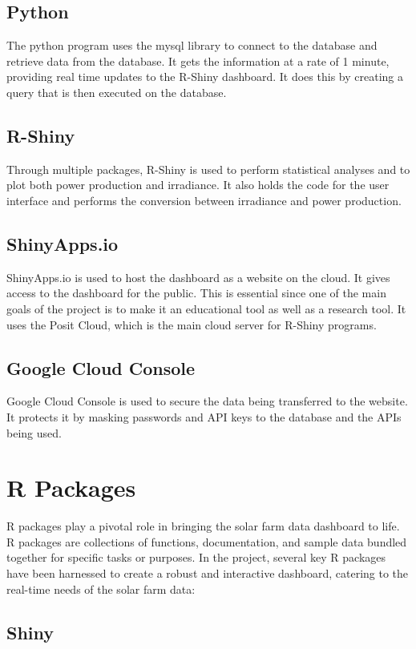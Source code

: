 \documentclass{sigchi}
\begin{document}
\subsection{Python}
The python program uses the mysql library\cite{MySQL} to connect to the database and retrieve data from the database. It gets the information at a rate of 1 minute, providing real time updates to the R-Shiny dashboard. It does this by creating a query that is then executed on the database.

\subsection{R-Shiny}
Through multiple packages, R-Shiny is used to perform statistical analyses and to plot both power production and irradiance. It also holds the code for the user interface and performs the conversion between irradiance and power production. 

\subsection{ShinyApps.io} 
ShinyApps.io is used to host the dashboard as a website on the cloud. It gives access to the dashboard for the public. This is essential since one of the main goals of the project is to make it an educational tool as well as a research tool. It uses the Posit Cloud, which is the main cloud server for R-Shiny programs.

\subsection{Google Cloud Console}
Google Cloud Console is used to secure the data being transferred to the website. It protects it by masking passwords and API keys to the database and the APIs being used.

\section{R Packages}
R packages play a pivotal role in bringing the solar farm data dashboard to life. R packages are collections of functions, documentation, and sample data bundled together for specific tasks or purposes. In the project, several key R packages have been harnessed to create a robust and interactive dashboard, catering to the real-time needs of the solar farm data:

\subsection{Shiny}
\end{document}
